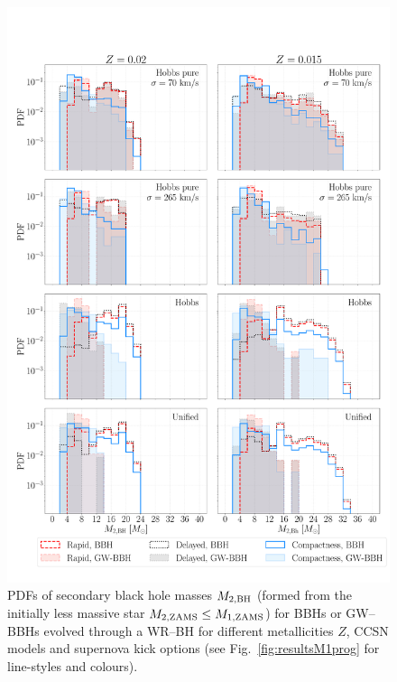 \documentclass[a4paper,titlepage]{book}     	%
\begin{document}
\begin{figure}[h]
	\centering
	\includegraphics[width=\textwidth]{./images/remM2.pdf}	
	\caption{PDFs of secondary black hole masses $M_{\rm 2, BH}$ (formed from the initially less massive star $M_{\rm 2, ZAMS} \leq M_{\rm 1, ZAMS}$) for BBHs or GW--BBHs evolved through a WR--BH for different metallicities $Z$, CCSN models and supernova kick options (see Fig.\ \ref{fig:resultsM1prog} for line-styles and colours).}\label{fig:resultsMBH2rem}
\end{figure}
\end{document}
